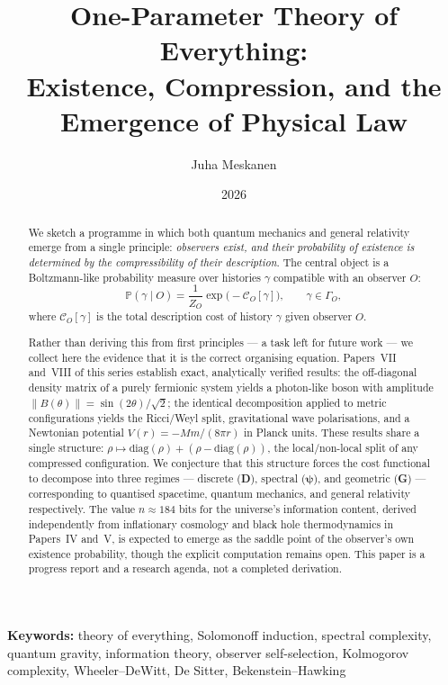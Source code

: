 \documentclass[11pt]{article}
\title{One-Parameter Theory of Everything:\\
Existence, Compression, and the Emergence of Physical Law}
\author{Juha Meskanen}
\date{2026}
\begin{document}
\maketitle

\begin{abstract}
We sketch a programme in which both quantum mechanics and general
relativity emerge from a single principle: \emph{observers exist, and
their probability of existence is determined by the compressibility of
their description}.
The central object is a Boltzmann-like probability measure over
histories $\gamma$ compatible with an observer $O$:
\[
\mathbb{P}(\gamma \mid O)
= \frac{1}{Z_O}\exp\!\bigl(-\mathcal{C}_O[\gamma]\bigr),
\qquad \gamma \in \Gamma_O,
\]
where $\mathcal{C}_O[\gamma]$ is the total description cost of history
$\gamma$ given observer $O$.

Rather than deriving this from first principles --- a task left for
future work --- we collect here the evidence that it is the correct
organising equation.
Papers~VII and~VIII of this series establish exact, analytically
verified results: the off-diagonal density matrix of a purely fermionic
system yields a photon-like boson with amplitude
$\|B(\theta)\| = \sin(2\theta)/\sqrt{2}$; the identical decomposition
applied to metric configurations yields the Ricci/Weyl split,
gravitational wave polarisations, and a Newtonian potential
$V(r) = -Mm/(8\pi r)$ in Planck units.
These results share a single structure:
$\rho \mapsto \mathrm{diag}(\rho) + (\rho - \mathrm{diag}(\rho))$,
the local/non-local split of any compressed configuration.
We conjecture that this structure forces the
cost functional to decompose into three regimes --- discrete (\textbf{D}),
spectral ($\boldsymbol{\psi}$), and geometric (\textbf{G}) --- corresponding
to quantised spacetime, quantum mechanics, and general relativity
respectively.
The value $n \approx 184$ bits for the universe's information content,
derived independently from inflationary cosmology and black hole
thermodynamics in Papers~IV and~V, is expected to emerge as the
saddle point of the observer's own existence probability, though the
explicit computation remains open.
This paper is a progress report and a research agenda, not a
completed derivation.
\end{abstract}

\textbf{Keywords:} theory of everything, Solomonoff induction, spectral
complexity, quantum gravity, information theory, observer self-selection,
Kolmogorov complexity, Wheeler--DeWitt, De Sitter, Bekenstein--Hawking
\end{document}
